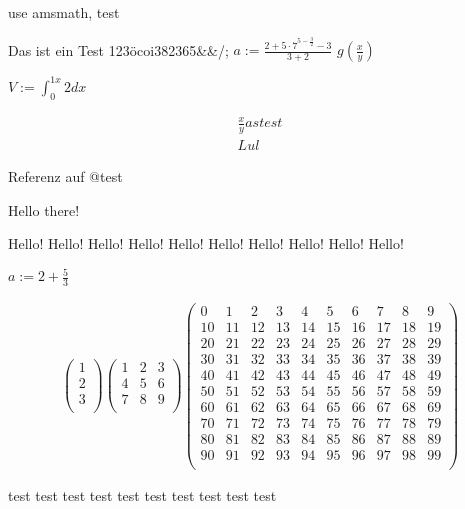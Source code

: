 % 
%
use amsmath, test


\test{} 



Das ist ein Test 123öcoi382365&&/;
$a:=\frac{2+{5 \cdot{} 7}^{5-\frac{3}{2}}-3}{3+2}$
$g\left(\frac{x}{y}\right)$

$V := \int_{0}^{1 x}2dx$

\begin{align}
    \frac{x}{y} as test\\
    Lul
\end{align}

Referenz auf @test

Hello there!

Hello!
Hello!
Hello!
Hello!
Hello!
Hello!
Hello!
Hello!
Hello!
Hello!


$a:=2+\frac{5}{3}$

\begin{align}
    \begin{pmatrix}
1\\
2\\
3\\
\end{pmatrix}
\begin{pmatrix}
1 & 2 & 3\\
4 & 5 & 6\\
7 & 8 & 9\\
\end{pmatrix}
\begin{pmatrix}
0 & 1 & 2 & 3 & 4 & 5 & 6 & 7 & 8 & 9\\
10 & 11 & 12 & 13 & 14 & 15 & 16 & 17 & 18 & 19\\
20 & 21 & 22 & 23 & 24 & 25 & 26 & 27 & 28 & 29\\
30 & 31 & 32 & 33 & 34 & 35 & 36 & 37 & 38 & 39\\
40 & 41 & 42 & 43 & 44 & 45 & 46 & 47 & 48 & 49\\
50 & 51 & 52 & 53 & 54 & 55 & 56 & 57 & 58 & 59\\
60 & 61 & 62 & 63 & 64 & 65 & 66 & 67 & 68 & 69\\
70 & 71 & 72 & 73 & 74 & 75 & 76 & 77 & 78 & 79\\
80 & 81 & 82 & 83 & 84 & 85 & 86 & 87 & 88 & 89\\
90 & 91 & 92 & 93 & 94 & 95 & 96 & 97 & 98 & 99\\
\end{pmatrix}

\end{align}





test
test
test
test
test
test
test
test
test
test


%
%
%
%
%
%
%
%
%
%
%